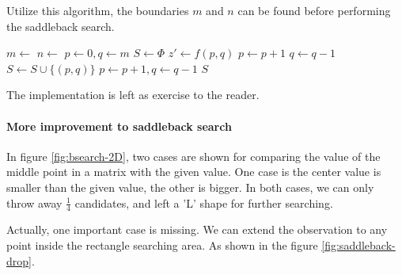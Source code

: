 \documentclass[UTF8]{article}
\begin{document}
Utilize this algorithm, the boundaries $m$ and $n$ can be found before performing the saddleback search.

\begin{algorithmic}[1]
  \State $m \gets$ 
  \State $n \gets$ 
  \State $p \gets 0, q \gets m$
  \State $S \gets \Phi$
    \State $z' \gets f(p, q)$
      \State $p \gets p + 1$
      \State $q \gets q - 1$
    \Else
      \State $S \gets S \cup \{(p, q)\}$
      \State $p \gets p + 1, q \gets q - 1$
    \EndIf
  \EndWhile
  \State \Return $S$
\EndFunction
\end{algorithmic}

The implementation is left as exercise to the reader.

\paragraph{More improvement to saddleback search}

In figure \ref{fig:bsearch-2D}, two cases are shown for comparing the value of the middle point in a matrix with the given value.
One case is the center value is smaller than the given value, the other is bigger. In both cases, we can only throw away
$\frac{1}{4}$ candidates, and left a 'L' shape for further searching.

Actually, one important case is missing. We can extend the observation to any point inside the rectangle searching area.
As shown in the figure \ref{fig:saddleback-drop}.
\end{document}
